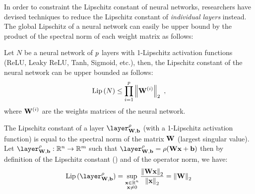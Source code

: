 \drawstar

\noindent
In order to constraint the Lipschitz constant of neural networks, researchers have devised techniques to reduce the Lipschitz constant of \emph{individual layers} instead. 
The global Lipschitz of a neural network can easily be upper bound by the product of the spectral norm of each weight matrix as follows:
\begin{proposition} Let $N$ be a neural network of $p$ layers with 1-Lipschitz activation functions (\eg ReLU,
  Leaky ReLU, Tanh, Sigmoid, etc.), then, the Lipschitz constant of the neural network can be upper bounded as follows:
  \begin{equation}
    \operatorname{Lip}{(N)} \leq \prod_{i=1}^p \norm{\mathbf{W}^{(i)}}_2 \enspace,
    \label{equation:ch3-naive_upper_bound_lipschitz}
  \end{equation}
  where $\mathbf{W}^{(i)}$ are the weights matrices of the neural network.
  \label{proposition:ch3-naive_upper_bound_lipschitz}
\end{proposition}

\begin{remark}
  The Lipschitz constant of a layer $\layer_{\Wmat, \bvec}^\rho$ (with a 1-Lipschitz activation function) is equal to the spectral norm of the matrix $\mathbf{W}$ (largest singular value).
  Let $\layer_{\Wmat, \bvec}^\rho: \Rbb^n \rightarrow \Rbb^m$ such that $\layer_{\Wmat, \bvec}^\rho = \rho(\Wmat \xvec + \bvec)$ then by definition of the Lipschitz constant () and of the operator norm, we have:
  \begin{equation}
    \lip{\layer_{\Wmat, \bvec}^\rho} = \sup_{\substack{\xvec \in \Rbb^n \\ \xvec \neq 0}} \frac{\norm{\Wmat \xvec}_2}{\norm{\xvec}_2} = \norm{\Wmat}_2
  \end{equation}
  \removespace
\end{remark}

